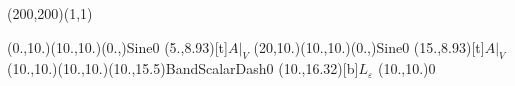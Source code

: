 \unitlength=1bp%

\begin{feynartspicture}(200,200)(1,1)

\FADiagram{}
\FAProp(0.,10.)(10.,10.)(0.,){Sine}{0}
\FALabel(5.,8.93)[t]{$A|_V$}
\FAProp(20,10.)(10.,10.)(0.,){Sine}{0}
\FALabel(15.,8.93)[t]{$A|_V$}
\FAProp(10.,10.)(10.,10.)(10.,15.5){BandScalarDash}{0}
\FALabel(10.,16.32)[b]{$L_\varepsilon$}
\FAVert(10.,10.){0}
\end{feynartspicture}

